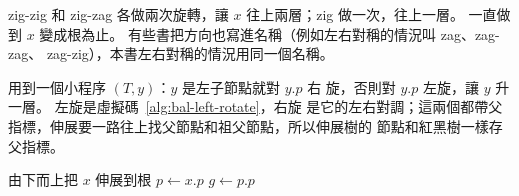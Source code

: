 zig-zig 和 zig-zag 各做兩次旋轉，讓 $x$ 往上兩層；zig 做一次，往上一層。 一直做到
$x$ 變成根為止。 有些書把方向也寫進名稱（例如左右對稱的情況叫 zag、zag-zag、
zag-zig），本書左右對稱的情況用同一個名稱。


 用到一個小程序 $(T, y)$：$y$ 是左子節點就對 $y.p$ 右
旋，否則對 $y.p$ 左旋，讓 $y$ 升一層。 左旋是虛擬碼~\ref{alg:bal-left-rotate}，右旋
是它的左右對調；這兩個都帶父指標，伸展要一路往上找父節點和祖父節點，所以伸展樹的
節點和紅黑樹一樣存父指標。

\begin{pseudo}[unbreakable, label=alg:bal-splay]{由下而上把 $x$ 伸展到根}
        \State $p \gets x.p$
        \State $g \gets p.p$
         
            \State {}
         
            \State {} 
            \State {}
        \Else {}
            \State {}
            \State {}
        \EndIf
    \EndWhile
\EndProcedure
\end{pseudo}

